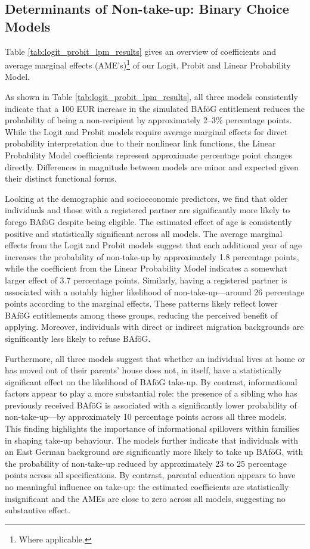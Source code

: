 \subsection{Determinants of Non-take-up: Binary Choice Models}
Table \ref{tab:logit_probit_lpm_results} gives an overview of coefficients and average marginal effects (AME's)\footnote{Where applicable.} of our Logit, Probit and Linear Probability Model. 

As shown in Table \ref{tab:logit_probit_lpm_results}, all three models consistently indicate that a 100 EUR increase in the simulated BAföG entitlement reduces the probability of being a non-recipient by approximately 2--3\% percentage points. 
While the Logit and Probit models require average marginal effects for direct probability interpretation due to their nonlinear link functions, the Linear Probability Model coefficients represent approximate percentage point changes directly. 
Differences in magnitude between models are minor and expected given their distinct functional forms.



Looking at the demographic and socioeconomic predictors, we find that older individuals and those with a registered partner are significantly more likely to forego BAföG despite being eligible. 
The estimated effect of age is consistently positive and statistically significant across all models. 
The average marginal effects from the Logit and Probit models suggest that each additional year of age increases the probability of non-take-up by approximately 1.8 percentage points, while the coefficient from the Linear Probability Model indicates a somewhat larger effect of 3.7 percentage points. 
Similarly, having a registered partner is associated with a notably higher likelihood of non-take-up—around 26 percentage points according to the marginal effects. 
These patterns likely reflect lower BAföG entitlements among these groups, reducing the perceived benefit of applying. Moreover, individuals with direct or indirect migration backgrounds are significantly less likely to refuse BAföG.

Furthermore, all three models suggest that whether an individual lives at home or has moved out of their parents' house does not, in itself, have a statistically significant effect on the likelihood of BAföG take-up. 
By contrast, informational factors appear to play a more substantial role: the presence of a sibling who has previously received BAföG is associated with a significantly lower probability of non-take-up—by approximately 10 percentage points across all three models. 
This finding highlights the importance of informational spillovers within families in shaping take-up behaviour. 
The models further indicate that individuals with an East German background are significantly more likely to take up BAföG, with the probability of non-take-up reduced by approximately 23 to 25 percentage points across all specifications. 
By contrast, parental education appears to have no meaningful influence on take-up: the estimated coefficients are statistically insignificant and the AMEs are close to zero across all models, suggesting no substantive effect.

